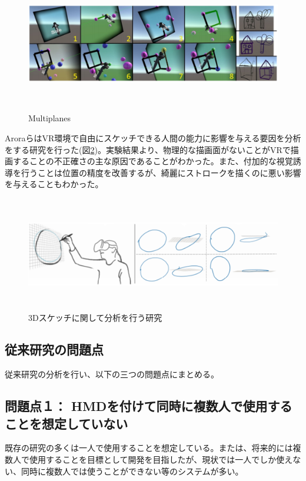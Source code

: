 \documentclass[11pt,a4j, titlepage]{jarticle} %
\begin{document}
\begin{figure}[H]
  \begin{center}
    \includegraphics[clip,height=6.0cm,width=15.0cm]{./multiplanes.eps}
    \caption{Multiplanes}
    \label{fig:multiplanes}
  \end{center}
\end{figure}

Aroraら\cite{arora}はVR環境で自由にスケッチできる人間の能力に影響を与える要因を分析をする研究を行った(図\ref{fig:evaluation_sketch})。実験結果より、物理的な描画面がないことがVRで描画することの不正確さの主な原因であることがわかった。また、付加的な視覚誘導を行うことは位置の精度を改善するが、綺麗にストロークを描くのに悪い影響を与えることもわかった。

\begin{figure}[H]
  \begin{center}
    \includegraphics[clip,height=5.0cm,width=15.0cm]{./evaluation_sketch.eps}
    \caption{3Dスケッチに関して分析を行う研究}
    \label{fig:evaluation_sketch}
  \end{center}
\end{figure}

\subsection{従来研究の問題点}
従来研究の分析を行い、以下の三つの問題点にまとめる。

\subsection*{問題点１： HMDを付けて同時に複数人で使用することを想定していない}
既存の研究の多くは一人で使用することを想定している。または、将来的には複数人で使用することを目標として開発を目指したが、現状では一人でしか使えない、同時に複数人では使うことができない等のシステムが多い。
\end{document}
